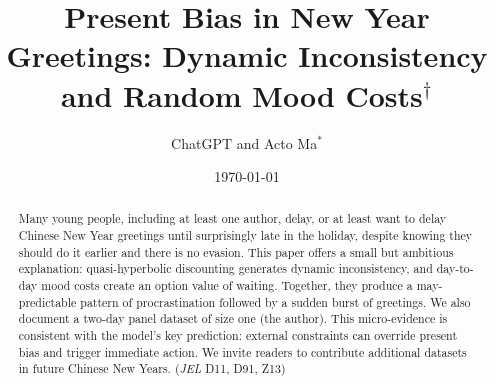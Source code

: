 \documentclass[AER]{AEA}
\begin{document}
\title{Present Bias in New Year Greetings: Dynamic Inconsistency and Random Mood Costs$^\dagger$}

\author{ChatGPT and Acto Ma$^*$}
\date{\today}

\begin{abstract}
Many young people, including at least one author, delay, or at least want to delay Chinese New Year greetings until surprisingly late in the holiday, despite knowing they should do it earlier and there is no evasion. This paper offers a small but ambitious explanation: quasi-hyperbolic discounting generates dynamic inconsistency, and day-to-day mood costs create an option value of waiting. Together, they produce a may-predictable pattern of procrastination followed by a sudden burst of greetings. We also document a two-day panel dataset of size one (the author). This micro-evidence is consistent with the model's key prediction: external constraints can override present bias and trigger immediate action. We invite readers to contribute additional datasets in future Chinese New Years.
\noindent (\textit{JEL} D11, D91, Z13) \\
\end{abstract}

\maketitle

\let\thefootnote\relax{}
\let\thefootnote\relax{}

\end{document}
